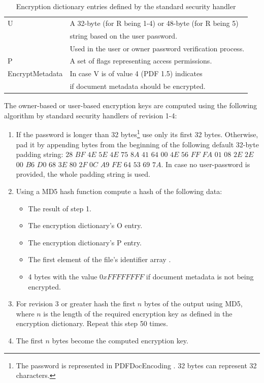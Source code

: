 \documentclass[11pt,oneside]{fithesis2}
\begin{document}
\begin{table}[hp]
\begin{tabular}{|l|l|}
	\hline
		U&A 32-byte (for R being 1-4) or 48-byte (for R being 5)\\ 
		&string based on the user password.\\
		&Used in the user or owner password verification process.\\
	\hline
		P&A set of flags representing access permissions.\\
	\hline
		EncryptMetadata& In case V is of value 4 (PDF 1.5) indicates\\
		&if document metadata should be encrypted.\\
	\hline
           \end{tabular}
	\caption{Encryption dictionary entries defined by the standard security handler \cite{pdf_spec}}
	\label{handler_entries}
\end{table}

The owner-based or user-based encryption keys are computed using the following algorithm by standard security handlers of revision 1-4: 

\begin{enumerate}
\setlength\itemsep{0.1em}
\item{If the password is longer than 32 bytes\footnote{The password is represented in PDFDocEncoding \cite[157]{pdf_spec}. 32 bytes can represent 32 characters.} use only its first 32 bytes. Otherwise, pad it by appending bytes from the beginning of the following default 32-byte padding string: $28$ $BF$ $4E$ $5E$ $4E$ $75$ $8A$ $41$ $64$ $00$ $4E$ $56$ $FF$ $FA$ $01$ $08$ $2E$ $2E$ $00$ $B6$ $D0$ $68$ $3E$ $80$ $2F$ $0C$ $A9$ $FE$ $64$ $53$ $69$ $7A$. In case no user-password is provided, the whole padding string is used.}
\item{Using a MD5 hash function compute a hash of the following data:}
	\begin{itemize}
		\item{The result of step 1.}
		\item{The encryption dictionary's O entry.}
		\item{The encryption dictionary's P entry.}
		\item{The first element of the file's identifier array \cite[p. 43]{pdf_spec}.}
		\item{4 bytes with the value $0xFFFFFFFF$ if document metadata is not being encrypted.}
	\end{itemize}
\item{For revision 3 or greater hash the first $n$ bytes of the output using MD5, where $n$ is the length of the required encryption key as defined in the encryption dictionary. Repeat this step 50 times.}
\item{The first $n$ bytes become the computed encryption key.}
\end{enumerate}
\end{document}
